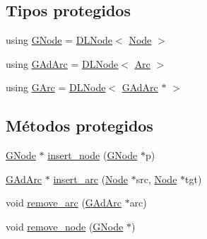 \subsection*{Tipos protegidos}
\begin{DoxyCompactItemize}
\item 
using \hyperlink{class_designar_1_1_digraph_a33b0d2b8820ada501522b0e67e63524a}{G\+Node} = \hyperlink{class_designar_1_1_d_l_node}{D\+L\+Node}$<$ \hyperlink{class_designar_1_1_digraph_a4dc921c41a480b7946a04170e997d8ae}{Node} $>$
\item 
using \hyperlink{class_designar_1_1_digraph_a0c6d846f23d1e82556fb6055557df53f}{G\+Ad\+Arc} = \hyperlink{class_designar_1_1_d_l_node}{D\+L\+Node}$<$ \hyperlink{class_designar_1_1_digraph_a0ceb278671f2a535c00fddccdeafd69f}{Arc} $>$
\item 
using \hyperlink{class_designar_1_1_digraph_a341acf8fb0195a8986158c29c4db1a89}{G\+Arc} = \hyperlink{class_designar_1_1_d_l_node}{D\+L\+Node}$<$ \hyperlink{class_designar_1_1_digraph_a0c6d846f23d1e82556fb6055557df53f}{G\+Ad\+Arc} $\ast$ $>$
\end{DoxyCompactItemize}
\subsection*{Métodos protegidos}
\begin{DoxyCompactItemize}
\item 
\hyperlink{class_designar_1_1_digraph_a33b0d2b8820ada501522b0e67e63524a}{G\+Node} $\ast$ \hyperlink{class_designar_1_1_digraph_a420fea8c892f9ce87a50489b97755026}{insert\+\_\+node} (\hyperlink{class_designar_1_1_digraph_a33b0d2b8820ada501522b0e67e63524a}{G\+Node} $\ast$p)
\item 
\hyperlink{class_designar_1_1_digraph_a0c6d846f23d1e82556fb6055557df53f}{G\+Ad\+Arc} $\ast$ \hyperlink{class_designar_1_1_digraph_a9180c479d24dc8dc648a37451c90d066}{insert\+\_\+arc} (\hyperlink{class_designar_1_1_digraph_a4dc921c41a480b7946a04170e997d8ae}{Node} $\ast$src, \hyperlink{class_designar_1_1_digraph_a4dc921c41a480b7946a04170e997d8ae}{Node} $\ast$tgt)
\item 
void \hyperlink{class_designar_1_1_digraph_abb7e909c1c44cd4cee2e742cb2d3fa17}{remove\+\_\+arc} (\hyperlink{class_designar_1_1_digraph_a0c6d846f23d1e82556fb6055557df53f}{G\+Ad\+Arc} $\ast$arc)
\item 
void \hyperlink{class_designar_1_1_digraph_a4a19c6f9333604d3d49992eeb5a6eeae}{remove\+\_\+node} (\hyperlink{class_designar_1_1_digraph_a33b0d2b8820ada501522b0e67e63524a}{G\+Node} $\ast$)
\end{DoxyCompactItemize}
